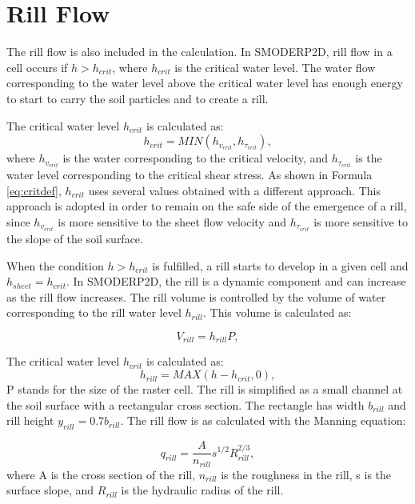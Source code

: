    \section{Rill Flow}

    The rill flow is also included in the calculation. In SMODERP2D, rill flow in a
    cell occurs if $h>h_{crit}$, where $h_{crit}$ is the critical water level. The
    water flow corresponding to the water level above the critical water level has
    enough energy to start to carry the soil particles and to create a rill.

    The critical water level $h_{crit}$ is calculated as:
    \begin{equation}
      h_{crit} = MIN(h_{v_{crit}},h_{\tau_{crit}}),
      \label{eq:critdef}
    \end{equation}
    where $h_{v_{crit}}$ is the water corresponding to the critical velocity, and
    $h_{\tau_{crit}}$ is the water level corresponding to the critical shear
    stress.  As shown in Formula \ref{eq:critdef}, $h_{crit}$ uses several values
    obtained with a different approach. This approach is adopted in order to remain
    on the safe side of the emergence of a rill, since $h_{v_{crit}}$ is more
    sensitive to the sheet flow velocity and $h_{\tau_{crit}}$ is more sensitive to
    the slope of the soil surface. 

    When the condition $h>h_{crit}$ is fulfilled, a rill starts to develop in a
    given cell and $h_{sheet}=h_{crit}$. In SMODERP2D, the rill is a dynamic component and
    can increase as the rill flow increases. The rill volume is controlled by the
    volume of water corresponding to the rill water level $h_{rill}$. This volume is
    calculated as:


    \begin{equation}
      V_{rill} = h_{rill}P,
      \label{eq:rillvol}
    \end{equation}

    The critical water level $h_{crit}$ is calculated as:
    \begin{equation}
      h_{rill} = MAX(h-h_{crit},0),
      \label{eq:hrill}
    \end{equation}
    P stands for the size of the raster cell. The rill is simplified as a small
    channel at the soil surface with a rectangular cross section. The rectangle has
    width $b_{rill}$ and rill height $y_{rill} = 0.7b_{rill}$. The rill flow is as
    calculated with the Manning equation: 

    \begin{equation}
        q_{rill} = \frac{A}{n_{rill}} s^{1/2} R_{rill}^{2/3},
      \label{eq:rillflow}
    \end{equation}
    where A is the cross section of the rill,  $n_{rill}$ is the roughness in the
    rill, s is the surface slope, and  $R_{rill}$  is the hydraulic radius of the
    rill. 

